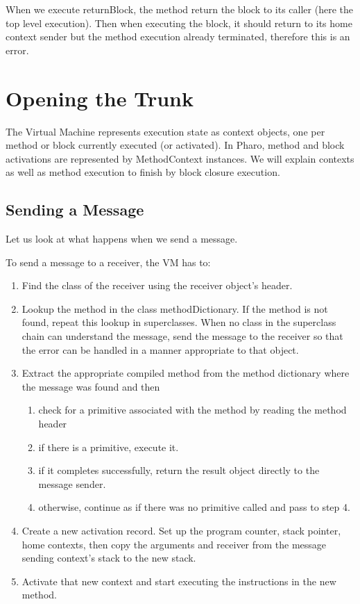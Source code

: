 \documentclass[a4paper,10pt,twoside]{book}
\begin{document}
When we execute returnBlock, the method return the block to its caller (here the top level execution). Then when executing the block, it should return to its home context sender but the method execution already terminated, therefore this is an error.




\section{Opening the Trunk}

The Virtual Machine represents execution state as context objects, one per method or block currently executed (or activated). In Pharo, method and block activations are represented by MethodContext instances.
We will explain contexts as well as method execution to finish by block closure execution.




\subsection{Sending a Message}
Let us look at what happens when we send a message.





To send a message to a receiver, the VM has to:

\begin{enumerate}
\item Find the class of the receiver using the receiver object's header.
\item Lookup the method in the class methodDictionary. If the method is not found, repeat this lookup in superclasses. When no class in the superclass chain can understand the message, send the message  to the receiver so that the error can be handled in a manner appropriate to that object.

\item Extract the appropriate compiled method from the method dictionary where the message was found and then
\begin{enumerate}
\item check for a primitive associated with the method by reading the method header
\item if there is a primitive, execute it.
\item if it completes successfully, return the result object directly to the message sender.
\item otherwise, continue as if there was no primitive called and pass to step 4.
\end{enumerate}
\item Create a new activation record. Set up the program counter, stack pointer,
home contexts, then copy the arguments and receiver from the message sending context's stack to the new stack.
\item Activate that new context and start executing the instructions in the new method.
\end{enumerate}
\end{document}

